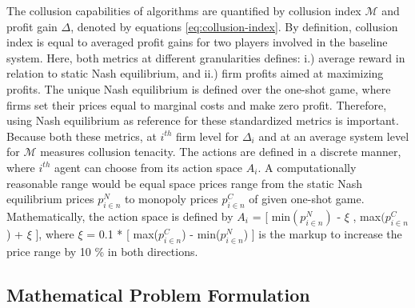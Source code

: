 \documentclass{article}
\begin{document}
The collusion capabilities of algorithms are quantified by collusion index \textit{$\mathcal{M}$} and profit gain \textit{$\Delta$}, denoted by equations \ref{eq:collusion-index}.
By definition, collusion index is equal to averaged profit gains for two players involved in the baseline system.
Here, both metrics at different granularities defines: i.) average reward in relation to static Nash equilibrium, and ii.) firm profits aimed at maximizing profits.
The unique Nash equilibrium is defined over the one-shot game, where firms set their prices equal to marginal costs and make zero profit.
Therefore, using Nash equilibrium as reference for these standardized metrics is important. Because both these metrics, at \textit{$i^{th}$} firm level for \textit{$\Delta_i$} and at an average system level for \textit{$\mathcal{M}$} measures collusion tenacity.
The actions are defined in a discrete manner, where \textit{$i^{th}$} agent can choose from its action space \textit{$A_i$}.
A computationally reasonable range would be equal space prices range from the static Nash equilibrium prices \textit{$p_{i \in n}^{N}$} to monopoly prices \textit{$p_{i \in n}^{C}$} of given one-shot game.
Mathematically, the action space is defined by \textit{$A_i$} = [ min$(p_{i \in n}^{N})$ - $\xi$ , max$(p_{i \in n}^{C}$) + $\xi$ ], where $\xi$ = 0.1 * [ max($p_{i \in n}^{C}$) - min($p_{i \in n}^{N}$) ] is the markup to increase the price range by 10 \% in both directions.


\subsection{Mathematical Problem Formulation}
\end{document}

